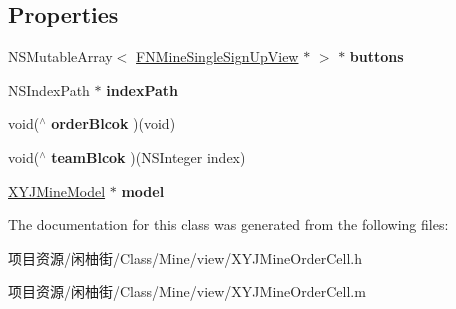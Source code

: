 \subsection*{Properties}
\begin{DoxyCompactItemize}
\item 
\mbox{\label{interface_x_y_j_mine_order_cell_aab06c66a0ed95987b46325d5886a5b67}} 
N\+S\+Mutable\+Array$<$ \mbox{\hyperlink{interface_f_n_mine_single_sign_up_view}{F\+N\+Mine\+Single\+Sign\+Up\+View}} $\ast$ $>$ $\ast$ {\bfseries buttons}
\item 
\mbox{\label{interface_x_y_j_mine_order_cell_a7590a2ef08a44706614dfb043d3eac58}} 
N\+S\+Index\+Path $\ast$ {\bfseries index\+Path}
\item 
\mbox{\label{interface_x_y_j_mine_order_cell_a22911c3356a2119e5602ecdb899c7a47}} 
void($^\wedge$ {\bfseries order\+Blcok} )(void)
\item 
\mbox{\label{interface_x_y_j_mine_order_cell_a8e479a05d0d9b98d30a0b1f33ba27f4f}} 
void($^\wedge$ {\bfseries team\+Blcok} )(N\+S\+Integer index)
\item 
\mbox{\label{interface_x_y_j_mine_order_cell_a3344ca54462cbb0177f30bca5f1991a8}} 
\mbox{\hyperlink{interface_x_y_j_mine_model}{X\+Y\+J\+Mine\+Model}} $\ast$ {\bfseries model}
\end{DoxyCompactItemize}


The documentation for this class was generated from the following files\+:\begin{DoxyCompactItemize}
\item 
项目资源/闲柚街/\+Class/\+Mine/view/X\+Y\+J\+Mine\+Order\+Cell.\+h\item 
项目资源/闲柚街/\+Class/\+Mine/view/X\+Y\+J\+Mine\+Order\+Cell.\+m\end{DoxyCompactItemize}
